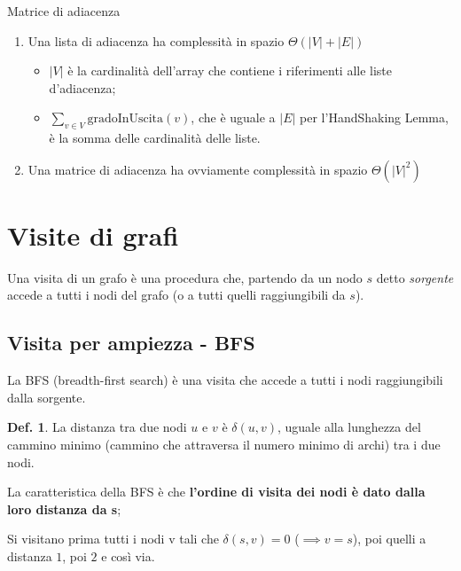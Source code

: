 \documentclass[a4paper,10pt]{article}
\theoremstyle{definition}
\newtheorem{deff}{Def.}[subsubsection]
\begin{document}
\begin{multicols}{3}
\begin{center}
Matrice di adiacenza
\end{center}

\end{multicols}
\begin{enumerate}
 \item Una lista di adiacenza ha complessità in spazio $\Theta(|V| + |E|)$ 
 
 \begin{itemize}
  \item 
 $|V|$ è la cardinalità dell'array che contiene i riferimenti alle liste d'adiacenza;
 \item $\sum\limits_{v \in V} \text{gradoInUscita}(v)$, che è uguale a $|E|$ per l'HandShaking Lemma, è la somma delle cardinalità delle liste.
 \end{itemize}
 
\item Una matrice di adiacenza ha ovviamente complessità in spazio $\Theta(|V|^2)$

\end{enumerate}


\section{Visite di grafi}
Una visita di un grafo è una procedura che, partendo da un nodo $s$ detto \emph{sorgente} accede a tutti i nodi del grafo (o a tutti quelli raggiungibili da $s$).
\subsection{Visita per ampiezza - BFS}
La BFS (breadth-first search) è una visita che accede a tutti i nodi raggiungibili dalla sorgente.

\begin{deff}
    La distanza tra due nodi $u$ e $v$ è $\delta(u, v)$, uguale alla lunghezza del cammino minimo (cammino che attraversa il numero minimo di archi) tra i due nodi.
\end{deff}

La caratteristica della BFS è che \textbf{l'ordine di visita dei nodi è dato dalla loro distanza da s}; 

Si visitano prima tutti i nodi v tali che  $\delta(s, v) = 0$ ($\implies v=s$), poi quelli a distanza $1$, poi $2$ e così via.
\end{document}

